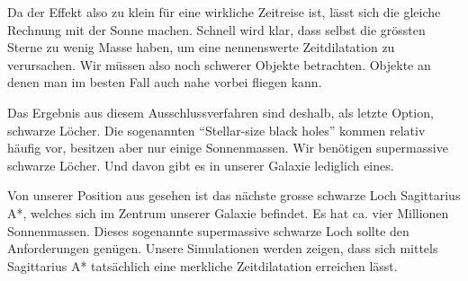 \begin{refsection}
    Da der Effekt also zu klein für eine wirkliche Zeitreise ist, lässt sich die gleiche Rechnung mit der Sonne machen. Schnell wird klar, dass selbst die grössten Sterne zu wenig Masse haben, um eine nennenswerte Zeitdilatation zu verursachen. Wir müssen also noch schwerer Objekte betrachten. Objekte an denen man im besten Fall auch nahe vorbei fliegen kann. 
     
    Das Ergebnis aus diesem Ausschlussverfahren sind deshalb, als letzte Option, schwarze Löcher. Die sogenannten ``Stellar-size black holes'' kommen relativ häufig vor, besitzen aber nur einige Sonnenmassen. Wir benötigen supermassive schwarze Löcher. Und davon gibt es in unserer Galaxie lediglich eines.
    
     Von unserer Position aus gesehen ist das nächste grosse schwarze Loch Sagittarius A*, welches sich im Zentrum unserer Galaxie befindet. Es hat ca. vier Millionen Sonnenmassen. Dieses sogenannte supermassive schwarze Loch sollte den Anforderungen genügen. Unsere Simulationen werden zeigen, dass sich mittels Sagittarius A* tatsächlich eine merkliche Zeitdilatation erreichen lässt.
    

\end{refsection}
